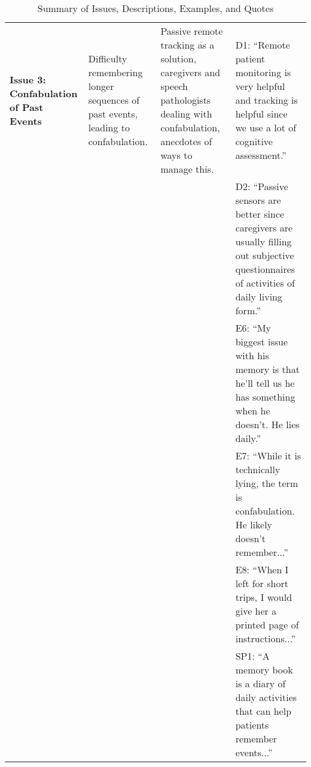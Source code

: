 \begin{table*}
\begin{tabular}{|l|p{3cm}|p{4cm}|p{6cm}|}
\textbf{Issue 3: Confabulation of Past Events} & Difficulty remembering longer sequences of past events, leading to confabulation. & Passive remote tracking as a solution, caregivers and speech pathologists dealing with confabulation, anecdotes of ways to manage this. & D1: ``Remote patient monitoring is very helpful and tracking is helpful since we use a lot of cognitive assessment.'' \\
& & & D2: ``Passive sensors are better since caregivers are usually filling out subjective questionnaires of activities of daily living form.'' \\
& & & E6: ``My biggest issue with his memory is that he'll tell us he has something when he doesn't. He lies daily.'' \\
& & & E7: ``While it is technically lying, the term is confabulation. He likely doesn't remember...'' \\
& & & E8: ``When I left for short trips, I would give her a printed page of instructions...'' \\
& & & SP1: ``A memory book is a diary of daily activities that can help patients remember events...'' \\ \hline
\end{tabular}
\caption{Summary of Issues, Descriptions, Examples, and Quotes}
\label{tab:issues}
\end{table*}

